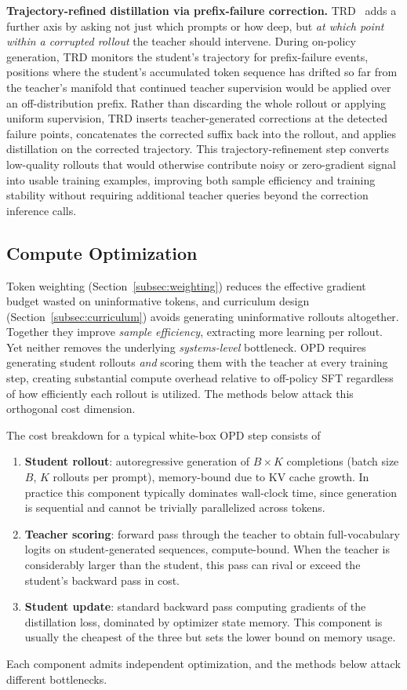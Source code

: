\documentclass{article} %
\begin{document}
\textbf{Trajectory-refined distillation via prefix-failure correction.} TRD~\citep{2606.08432} adds a further axis by asking not just which prompts or how deep, but \emph{at which point within a corrupted rollout} the teacher should intervene. During on-policy generation, TRD monitors the student's trajectory for prefix-failure events, positions where the student's accumulated token sequence has drifted so far from the teacher's manifold that continued teacher supervision would be applied over an off-distribution prefix. Rather than discarding the whole rollout or applying uniform supervision, TRD inserts teacher-generated corrections at the detected failure points, concatenates the corrected suffix back into the rollout, and applies distillation on the corrected trajectory. This trajectory-refinement step converts low-quality rollouts that would otherwise contribute noisy or zero-gradient signal into usable training examples, improving both sample efficiency and training stability without requiring additional teacher queries beyond the correction inference calls.

\subsection{Compute Optimization}
\label{subsec:compute}

Token weighting (Section~\ref{subsec:weighting}) reduces the effective gradient budget wasted on uninformative tokens, and curriculum design (Section~\ref{subsec:curriculum}) avoids generating uninformative rollouts altogether. Together they improve \emph{sample efficiency}, extracting more learning per rollout. Yet neither removes the underlying \emph{systems-level} bottleneck. OPD requires generating student rollouts \emph{and} scoring them with the teacher at every training step, creating substantial compute overhead relative to off-policy SFT regardless of how efficiently each rollout is utilized. The methods below attack this orthogonal cost dimension.

The cost breakdown for a typical white-box OPD step consists of
\begin{enumerate}[nosep]
    \item \textbf{Student rollout}: autoregressive generation of $B \times K$ completions (batch size $B$, $K$ rollouts per prompt), memory-bound due to KV cache growth. In practice this component typically dominates wall-clock time, since generation is sequential and cannot be trivially parallelized across tokens.
    \item \textbf{Teacher scoring}: forward pass through the teacher to obtain full-vocabulary logits on student-generated sequences, compute-bound. When the teacher is considerably larger than the student, this pass can rival or exceed the student's backward pass in cost.
    \item \textbf{Student update}: standard backward pass computing gradients of the distillation loss, dominated by optimizer state memory. This component is usually the cheapest of the three but sets the lower bound on memory usage.
\end{enumerate}
Each component admits independent optimization, and the methods below attack different bottlenecks.
\end{document}
